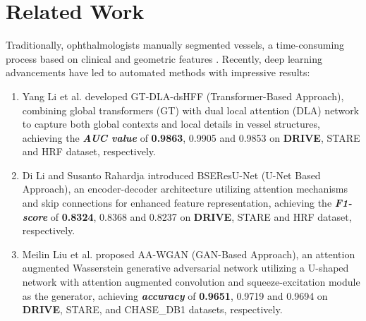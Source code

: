 \documentclass[12pt,letterpaper]{article}
\begin{document}
\section{Related Work}
Traditionally, ophthalmologists manually segmented vessels, a time-consuming process based on clinical and geometric features \cite{review2025}. Recently, deep learning advancements have led to automated methods with impressive results: 
\begin{enumerate}
    \item Yang Li et al. \cite{work1} developed GT-DLA-dsHFF (Transformer-Based Approach), combining global transformers (GT) with dual local attention (DLA) network to capture both global contexts and local details in vessel structures, achieving the \textbf{\textit{AUC value}} of \textbf{0.9863}, 0.9905 and 0.9853 on \textbf{DRIVE}, STARE and HRF dataset, respectively. 
    \item Di Li and Susanto Rahardja \cite{work2} introduced BSEResU-Net (U-Net Based Approach), an encoder-decoder architecture utilizing attention mechanisms and skip connections for enhanced feature representation, achieving the \textbf{\textit{F1-score}} of \textbf{0.8324}, 0.8368 and 0.8237 on \textbf{DRIVE}, STARE and HRF dataset, respectively. 
    \item Meilin Liu et al. \cite{work3} proposed AA-WGAN (GAN-Based Approach), an attention augmented Wasserstein generative adversarial network utilizing a U-shaped network with attention augmented convolution and squeeze-excitation module as the generator, achieving \textbf{\textit{accuracy}} of \textbf{0.9651}, 0.9719 and 0.9694 on \textbf{DRIVE}, STARE, and CHASE\_DB1 datasets, respectively.
\end{enumerate}
\end{document}
